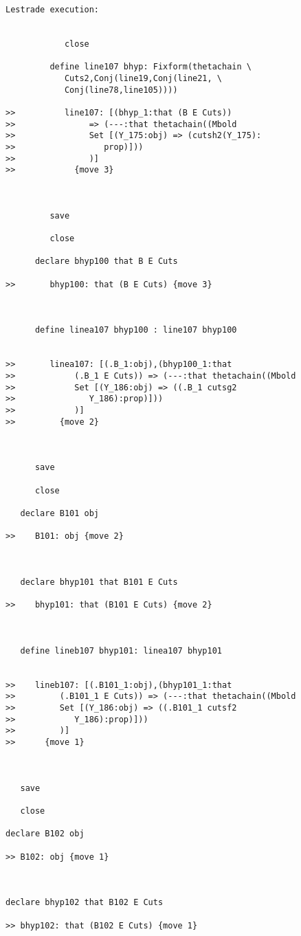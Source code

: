 \documentclass[12pt]{article}
\begin{document}
\begin{verbatim}Lestrade execution:


            close

         define line107 bhyp: Fixform(thetachain \
            Cuts2,Conj(line19,Conj(line21, \
            Conj(line78,line105))))

>>          line107: [(bhyp_1:that (B E Cuts))
>>               => (---:that thetachain((Mbold
>>               Set [(Y_175:obj) => (cutsh2(Y_175):
>>                  prop)]))
>>               )]
>>            {move 3}



         save

         close

      declare bhyp100 that B E Cuts

>>       bhyp100: that (B E Cuts) {move 3}



      define linea107 bhyp100 : line107 bhyp100


>>       linea107: [(.B_1:obj),(bhyp100_1:that
>>            (.B_1 E Cuts)) => (---:that thetachain((Mbold
>>            Set [(Y_186:obj) => ((.B_1 cutsg2
>>               Y_186):prop)]))
>>            )]
>>         {move 2}



      save

      close

   declare B101 obj

>>    B101: obj {move 2}



   declare bhyp101 that B101 E Cuts

>>    bhyp101: that (B101 E Cuts) {move 2}



   define lineb107 bhyp101: linea107 bhyp101


>>    lineb107: [(.B101_1:obj),(bhyp101_1:that
>>         (.B101_1 E Cuts)) => (---:that thetachain((Mbold
>>         Set [(Y_186:obj) => ((.B101_1 cutsf2
>>            Y_186):prop)]))
>>         )]
>>      {move 1}



   save

   close

declare B102 obj

>> B102: obj {move 1}



declare bhyp102 that B102 E Cuts

>> bhyp102: that (B102 E Cuts) {move 1}




\end{verbatim}
\end{document}
